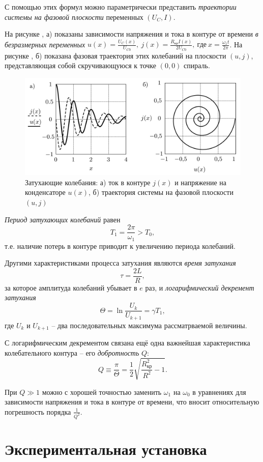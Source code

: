 \documentclass[a4paper,10pt]{article}
\begin{document}
С помощью этих формул можно параметрически представить \textit{траектории системы на фазовой плоскости} переменных $(U_C,I)$.

На рисунке , а) показаны зависимости напряжения и тока в контуре от времени \textit{в безразмерных переменных} $u(x)=\frac{U_C(x)}{U_{C0}},\ j(x)=\frac{R_{\text{кр}}I(x)}{2U_{C0}},\ \text{где}\ x=\frac{\omega_1t}{2\pi}$. На рисунке , б) показана фазовая траектория этих колебаний на плоскости $(u,j)$, представляющая собой скручивающуюся к точке $(0,0)$ спираль.

\begin{figure}[h]
	\centering
	\includegraphics[scale=0.24]{th}
	\caption{Затухающие колебания: а) ток в контуре $j(x)$ и напряжение на конденсаторе $u(x)$, б) траектория системы на фазовой плоскости $(u,j)$} \label{th}
\end{figure}

\textit{Период затухающих колебаний} равен\[T_1=\frac{2\pi}{\omega_1} > T_0,\]т.е. наличие потерь в контуре приводит к увеличению периода колебаний.

Другими характеристиками процесса затухания являются \textit{время затухания}\[\tau=\frac{2L}{R},\] за которое амплитуда колебаний убывает в $e$ раз, и \textit{логарифмический декремент затухания}\[\Theta=\ln{\frac{U_k}{U_{k+1}}}=\gamma T_1,\]где $U_k$ и $U_{k+1}$ -- два последовательных максимума рассматрваемой величины.

С логарифмическим декрементом связана ещё одна важнейшая характеристика колебательного контура -- его \textit{добротность} $Q$:\[Q\equiv\frac{\pi}{\Theta}=\frac{1}{2}\sqrt{\frac{R_{\text{кр}}^2}{R^2}-1}.\]

При $Q\gg1$ можно с хорошей точностью заменить $\omega_1$ на $\omega_0$ в уравнениях для зависимости напряжения и тока в контуре от времени, что вносит относительную погрешность порядка $\frac{1}{Q^2}$.

\section*{Экспериментальная установка}
\end{document}
